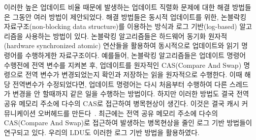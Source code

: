 이러한 높은 업데이트 비율 때문에 발생하는 업데이트 직렬화 문제에 대한 해결 방법들은
그동안 여러 방법이 제안되었다. 
해결 방법들은 동시적 업데이트를 위한, 논블락킹 자료구조(non-blocking data structure)를 이용하는 
방식과 로그 기반(log-based) 알고리즘을 사용하는 방법이 있다.
논블락킹 알고리즘들은 하드웨어 동기화 원자적(hardware synchronized atomic) 연산들을 활용하여
동시적으로 업데이트와 읽기 명령어를 수행하게한 자료구조이다.
예를들어, 논블락킹 알고리즘들은 업데이트 명령어 수행전에 전역 변수를 지켜본 후, 업데이트를 
원자적인 CAS(Compare And Swap) 명령으로 전역 변수가 변경되었는지 확인과 저장하는 읽을 원자적으로 
수행한다. 
이때 해당 전역변수가 수정되었다면, 업데이트 명령어는 다시 처음부터 수행하여 다른 스레드가 변경을 
안 할때까지 같은 일을 수행하는 방법이다.  
하지만 이러한 방법도 결국 전역 공유 메모리 주소에 다수의 CAS로 접근하여
병목현상이 생긴다. 이것은 결국 캐시 커뮤니케이션 오버헤드를 만든다~\cite{SilasBoydWickizerPth}.
최근에는 전역 공유 메모리 주소에 다수의 CAS(Compare And Swap)로 접근하여
발생하는 병목현상을 줄인 로그 기반 방법들이 연구되고 있다.
우리의 LDU도 이러한 로그 기반 방법을 활용하였다.




